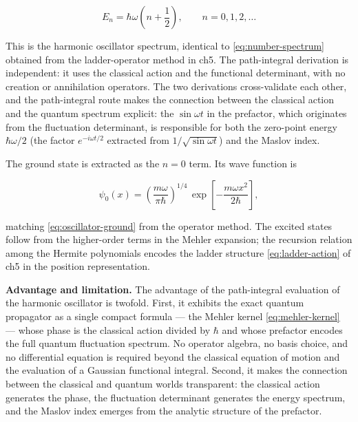 \begin{linenomath}
\begin{equation}
E_n = \hbar\omega\left(n + \frac{1}{2}\right), \qquad n = 0, 1, 2, \dots
\end{equation}
\end{linenomath}
This is the harmonic oscillator spectrum, identical to \eqref{eq:number-spectrum} obtained from the ladder-operator method in ch5. The path-integral derivation is independent: it uses the classical action and the functional determinant, with no creation or annihilation operators. The two derivations cross-validate each other, and the path-integral route makes the connection between the classical action and the quantum spectrum explicit: the $\sin\omega t$ in the prefactor, which originates from the fluctuation determinant, is responsible for both the zero-point energy $\hbar\omega/2$ (the factor $e^{-i\omega t/2}$ extracted from $1/\sqrt{\sin\omega t}$) and the Maslov index.

The ground state is extracted as the $n=0$ term. Its wave function is
\begin{linenomath}
\begin{equation}
\psi_0(x) = \left(\frac{m\omega}{\pi\hbar}\right)^{1/4}\,
\exp\!\left[-\frac{m\omega x^2}{2\hbar}\right],
\end{equation}
\end{linenomath}
matching \eqref{eq:oscillator-ground} from the operator method. The excited states follow from the higher-order terms in the Mehler expansion; the recursion relation among the Hermite polynomials encodes the ladder structure \eqref{eq:ladder-action} of ch5 in the position representation.

\medskip\noindent\textbf{Advantage and limitation.}
The advantage of the path-integral evaluation of the harmonic oscillator is twofold. First, it exhibits the exact quantum propagator as a single compact formula --- the Mehler kernel \eqref{eq:mehler-kernel} --- whose phase is the classical action divided by $\hbar$ and whose prefactor encodes the full quantum fluctuation spectrum. No operator algebra, no basis choice, and no differential equation is required beyond the classical equation of motion and the evaluation of a Gaussian functional integral. Second, it makes the connection between the classical and quantum worlds transparent: the classical action generates the phase, the fluctuation determinant generates the energy spectrum, and the Maslov index emerges from the analytic structure of the prefactor.

